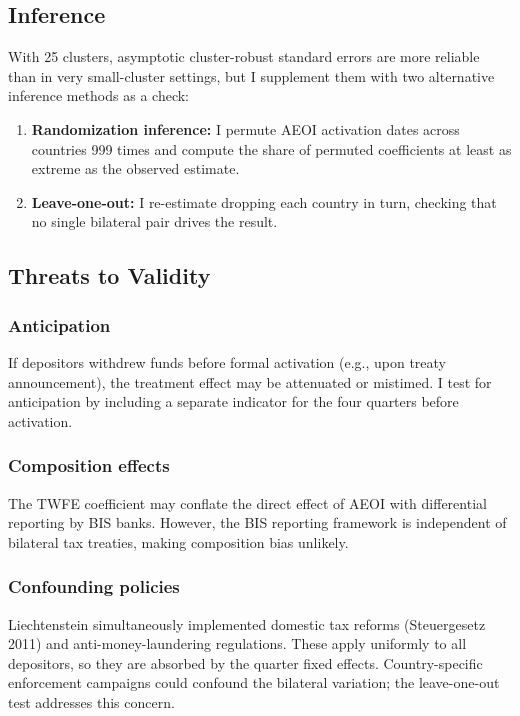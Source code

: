 \documentclass[12pt]{article}
\begin{document}
\subsection{Inference}

With 25 clusters, asymptotic cluster-robust standard errors are more reliable than in very small-cluster settings, but I supplement them with two alternative inference methods as a check:
\begin{enumerate}
  \item \textbf{Randomization inference:} I permute AEOI activation dates across countries 999 times and compute the share of permuted coefficients at least as extreme as the observed estimate.
  \item \textbf{Leave-one-out:} I re-estimate dropping each country in turn, checking that no single bilateral pair drives the result.
\end{enumerate}

\subsection{Threats to Validity}

\subsubsection*{Anticipation} If depositors withdrew funds before formal activation (e.g., upon treaty announcement), the treatment effect may be attenuated or mistimed. I test for anticipation by including a separate indicator for the four quarters before activation.

\subsubsection*{Composition effects} The TWFE coefficient may conflate the direct effect of AEOI with differential reporting by BIS banks. However, the BIS reporting framework is independent of bilateral tax treaties, making composition bias unlikely.

\subsubsection*{Confounding policies} Liechtenstein simultaneously implemented domestic tax reforms (Steuergesetz 2011) and anti-money-laundering regulations. These apply uniformly to all depositors, so they are absorbed by the quarter fixed effects. Country-specific enforcement campaigns could confound the bilateral variation; the leave-one-out test addresses this concern.
\end{document}
